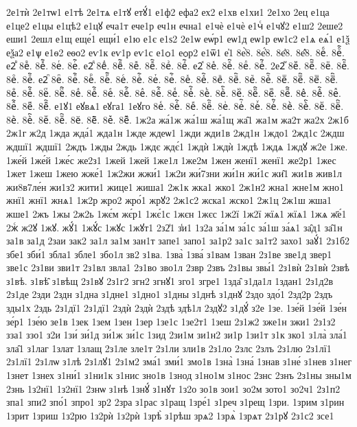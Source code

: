 {2е1тѝ
2е1тѡ1
е1тѣ
2е1тѧ
е1тꙋ
етꙋ́1
е1ф2
ефа2
ех2
е1хв
е1хи1
2е1хо
2ец
е1ца
е1це2
е1цы
е1цѣ2
е1цꙋ
еча1т
ече1р
еч1н
ечна1
е1чѐ
е1чѐ
е1чⷭ
е1чꙋ2
е1ш2
2еше2
еши1
2ешл
е1щ
еще́1
ещи́1
е1ю
е1є
е1ѕ2
2е1ѡ
еѡ́р1
еѡ1д
еѡ1р
еѡ1с2
е1ѧ
еѧ́1
е1ѯ
еѯа2
е1ѱ
е1ѳ2
еѳо2
еѵ1к
еѵ1р
еѵ1с
е1ѻ1
еѻр2
е1ѿ1
е҆1
8е҆̀8.
8е҆́8.
8е҆̈8.
8е҆̑8.
8еⷠ.
8еⷠ҇.
е2ⷡ
8еⷡ.
8еⷡ҇.
8еⷢ.
8еⷢ҇.
е2ⷣ
8еⷣ.
8еⷣ҇.
8еⷤ.
8еⷤ҇.
8еⷥ.
8еⷥ҇.
е2ⷦ
8еⷦ.
8еⷦ҇.
8еⷧ.
8еⷧ҇.
2е2ⷨ
8еⷨ.
8еⷨ҇.
8еⷩ.
8еⷩ҇.
8еⷪ.
8еⷪ҇.
е2ⷫ
8еⷫ.
8еⷫ҇.
8еⷬ.
8еⷬ҇.
8еⷭ.
8еⷭ҇.
8еⷮ.
8еⷮ҇.
8еⷯ.
8еⷯ҇.
8еⷰ.
8еⷰ҇.
8еⷱ.
8еⷱ҇.
8еⷲ.
8еⷲ҇.
8еⷳ.
8еⷳ҇.
8еⷴ.
8еⷴ҇.
8еⷵ.
8еⷵ҇.
8еⷶ.
8еⷶ҇.
8еⷷ.
8еⷷ҇.
8еⷸ.
8еⷸ҇.
8еⷹ.
8еⷹ҇.
8еⷺ.
8еⷺ҇.
8еⷻ.
8еⷻ҇.
8еⷼ.
8еⷼ҇.
8еⷽ.
8еⷽ҇.
8еⷾ.
8еⷾ҇.
8еⷿ.
8еⷿ҇.
е1ꙋ1
еꙋвѧ1
еꙋга1
1еꙋго
8еꙴ.
8еꙴ҇.
8еꙵ.
8еꙵ҇.
8еꙶ.
8еꙶ҇.
8еꙷ.
8еꙷ҇.
8еꙸ.
8еꙸ҇.
8еꙹ.
8еꙹ҇.
8еꙺ.
8еꙺ҇.
8еꙻ.
8еꙻ҇.
8е꙼.
8е꙼҇.
8е꙽.
8е꙽҇.
1ж2а
жа́1ж
жа́1ш
жа́1щ
жа̑1
жа1м
жа2т
жа2х
2ж1б
2ж1г
ж2д
1жда
жда́1
жда1н
1жде
ждеѡ1
1жди
жди1в
2жд1н
1ждо1
2жд1с
2ждш
ждшї1
ждшї1
2ждъ
1жды
2ждь
1ждє
ждє́1
1ждѝ
1ждѝ
1ждѣ
1ждѧ
1ждꙋ
ж2е
1же.
1же́й
1же́й
1же́с
же2з1
1жей
1жей
1же1л
1же2м
1жен
женї1
женї1
же2р1
1жес
1жет
1жеш
1жею
жже́1
1ж2жи
жжи́1
1ж2и
жи́7зни
жи́1н
жи́1с
жи̑1
жи1в
жив1л
жи8в7ле́н
жи1з2
жити1
жице1
жиша1
2ж1к
жка1
жко1
2ж1н2
жна1
жне1м
жно1
жнї1
жнї1
жнѧ1
1ж2р
жро2
жро́1
жрꙋ2
2ж1с2
жска1
жско1
2ж1ц
2ж1ш
жша1
жше1
2жъ
1жы
2ж2ь
1жє́м
жє́р1
1жє́1с
1жєн
1жєс
1ж2ї
1ж2ї
жїѧ1
жїѧ1
1жѧ
ж҃е́1
2жⷭ
ж2ꙋ
1жꙋ.
жꙋ́1
1жꙋ́с
1жꙋс
1жꙋт1
2з2̾1
з̾и1
1з2а
за́1м
за́1с
за́1ш
за́ѧ1
за̑д1
за̑1н
за1в
за1д
2заи
зак2
за1л
за1м
зан1т
запе1
запо1
за1р2
за1с
за1т2
захо1
заꙋ́1
2з1б2
збе1
зби́1
збла1
збле1
збо1л
зв2
з1ва.
1зва̀
1зва́
з1вам
1зван
2з1ве
зве1д
звер1
зве1с
2з1ви
зви1т
2з1вл
звла1
2з1во
зво1л
2звр
2звъ
2з1вы
звы́1
2з1вѝ
2з1вѝ
2звѣ
з1вѣ.
з1вѣ̑
з1вѣщ
2з1вꙋ
2з1г2
згн2
згнꙋ1
зго1
згре1
1зда̑
з1да1л
1здан1
2з1д2в
2з1де
2зди
2здн
з1дна
з1дне1
з1дно1
з1дны
з1днѣ
з1днꙋ
2здо
здо́1
2зд2р
2здъ
зды1х
2здь
2з1дї1
2з1дї1
2здѝ
2здѝ
2здѣ
здѣ1л
2здꙋ2
з1дꙋ́
з2е
1зе.
1зе́й
1зе́й
1зе́н
зе́р1
1зе́ю
зе1в
1зек
1зем
1зен
1зер
1зе1с
1зе2т1
1зеш
2з1ж2
зже1н
зжи1
2з1з2
зза1
ззо1
з2и
1зи́
зи́1д
зи́1ж
зи́1с
1зид
2зи1м
зи1н2
зи1р
1зи1т
з1к
зко1
з1ла̀
зла́1
зла̑1
з1лаг
1злат
1злащ
2з1ле
зле1т
2з1ли
зли1в
2з1ло
2злс
2злъ
2з1лю
2з1лї1
2з1лї1
2з1лѡ
з1лѣ
2з1лꙋ1
2з1м2
зма́1
зми́1
змо1в
1зна̀
1зна́
1знав
з1не́
з1нев
з1нег
1знет
1знех
з1ни́1
з1ни1к
з1нис
зно1в
1знод
з1но1м
з1нос
2знс
2знъ
2з1ны
зны1м
2знь
1з2нї1
1з2нї1
2знѡ
з1нѣ
1знꙋ́
з1нꙋт
1з2о
зо1в
зои1
зо2м
зото1
зо2ч1
2з1п2
зпа1
зпи2
зпо́1
зпро1
зр2
2зра
з1рас
з1ращ
1зре́1
з1реч
з1рещ
1зри.
1зрим
з1рин
1зрит
1зриш
1з2рю
1з2рѝ
1з2рѝ
1зрѣ̀
з1рѣш
зрѧ2
1зрѧ̀
1зрѧт
2з1рꙋ
2з1с2
зсе1
}
